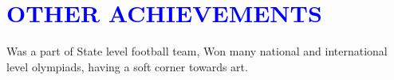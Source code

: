 \documentclass{article}
\begin{document}
\section*{\large{\textcolor{blue}{\uppercase{Other achievements}}}}

\vspace{4pt}
	Was a part of State level football team, Won many national and international level olympiads, having a soft corner towards art. 

\vspace{3pt}
\end{document}
